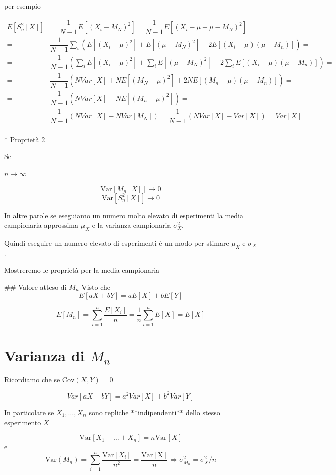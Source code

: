 \documentclass[onecolumn,12pt]{book}\usepackage[]{graphicx}\usepackage[]{color}
\begin{document}
per esempio

\[\begin{align} 
E[S^2_n[X]] &=\dfrac{1}{N-1}E[(X_i-M_N)^2]=\dfrac{1}{N-1}E[(X_i-\mu+\mu-M_N)^2]\\
=&\dfrac{1}{N-1}\sum_i \left(E[(X_i-\mu)^2]+E[(\mu-M_N)^2]+2 E[(X_i-\mu)(\mu-M_n)]\right)=\\
=&\dfrac{1}{N-1}\left(\sum_i E[(X_i-\mu)^2]+\sum_i E[(\mu-M_N)^2]+2 \sum_i E[(X_i-\mu)(\mu-M_n)]\right)=\\
=&\dfrac{1}{N-1}  \left(N Var[X]+N E[(M_N-\mu)^2]+2 N E[(M_n-\mu)(\mu-M_n)] \right)= \\
=&\dfrac{1}{N-1}  \left(N Var[X]- N E[(M_n-\mu)^2] \right)= \\
=&\dfrac{1}{N-1}  \left(N Var[X]- N Var[M_N] \right)=\dfrac{1}{N-1}  \left(N Var[X]-  Var[X] \right)=Var[X] \\\end{align}
\]

* Proprietà  2

Se 

$n \rightarrow \infty$

$$\mathrm{Var}[M_n[X]]\rightarrow 0 $$
$$\mathrm{Var}[S^2_n[X]]\rightarrow 0$$

In altre parole se eseguiamo un numero molto elevato di esperimenti la media campionaria approssima  $\mu_X$  e la varianza campionaria $\sigma^2_X$.
 

Quindi eseguire  un numero elevato di esperimenti è un modo per stimare $\mu_X$ e $\sigma_X$.

Mostreremo le proprietà per la media campionaria

## Valore atteso di $M_n$
Visto che
\[ E[ a X + b Y] = a E[X] + b E[Y]\] 

\[ E[M_n]=\sum_{i=1}^n  \frac{E[X_i]}{n}=\frac{1}{n}\sum_{i=1}^n E[X]=E[X]\]


\section{Varianza di $M_n$}

Ricordiamo che se $\mathrm{Cov}(X,Y)=0$

$$Var[a X + b Y] = a^2 Var[X] + b^2 Var[Y]$$

In particolare se $X_1,\ldots,X_n$ sono repliche **indipendenti** dello stesso esperimento $X$ 

$$\mathrm{Var}[X_1+\ldots+ X_n]=
n  \mathrm{Var}[X]$$
e
$$\mathrm{Var}(M_n)=\sum_{i=1}^n \dfrac{\mathrm{Var}[X_i]}{n^2}= \frac{\mathrm{Var[X]}}{n}\Rightarrow   \sigma^2_{M_n} =  \sigma_X^2/n$$
\end{document}
